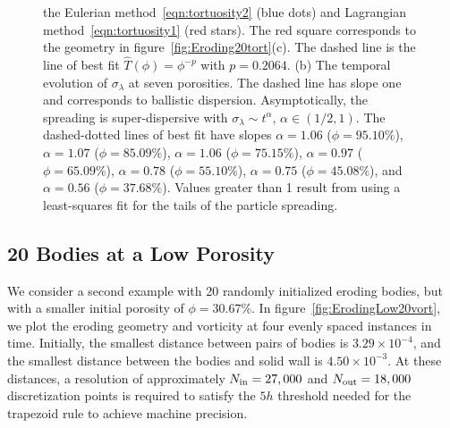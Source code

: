 \documentclass{jfm}
\begin{document}
\begin{figure}
{the Eulerian method~\eqref{eqn:tortuosity2} (blue dots) and Lagrangian
method~\eqref{eqn:tortuosity1} (red stars).  The red square corresponds
to the geometry in figure~\ref{fig:Eroding20tort}(c).  The dashed line
is the line of best fit $\widehat{T}(\phi)=\phi^{-p}$ with $p=0.2064$.
(b) The temporal evolution of $\sigma_\lambda$ at seven porosities.  The
dashed line has slope one and corresponds to ballistic dispersion.
Asymptotically, the spreading is super-dispersive with $\sigma_\lambda
\sim t^\alpha$, $\alpha \in (1/2,1)$.  The dashed-dotted lines of best
fit have slopes $\alpha = 1.06$ ($\phi=95.10\%$), $\alpha = 1.07$
($\phi=85.09\%$), $\alpha = 1.06$ ($\phi=75.15\%$), $\alpha = 0.97$
($\phi=65.09\%$), $\alpha = 0.78$ ($\phi=55.10\%$), $\alpha = 0.75$
($\phi=45.08\%$), and $\alpha = 0.56$ ($\phi=37.68\%$).  Values greater
than 1 result from using a least-squares fit for the tails of the
particle spreading.}
\end{figure}


\subsection{20 Bodies at a Low Porosity}
We consider a second example with 20 randomly initialized eroding
bodies, but with a smaller initial porosity of $\phi = 30.67\%$.  In
figure~\ref{fig:ErodingLow20vort}, we plot the eroding geometry and
vorticity at four evenly spaced instances in time.  Initially, the
smallest distance between pairs of bodies is $3.29 \times 10^{-4}$, and
the smallest distance between the bodies and solid wall is $4.50 \times
10^{-3}$.  At these distances, a resolution of approximately $N_{\mathrm{in}} =
27,000$ and $N_{\mathrm{out}} = 18,000$ discretization points is required to
satisfy the $5h$ threshold needed for the trapezoid rule to achieve
machine precision.
\end{document}
